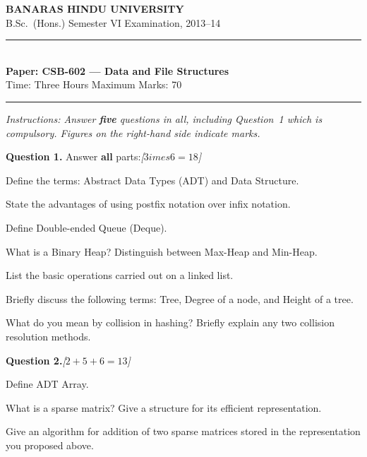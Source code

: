 \documentclass[11pt,a4paper]{article}
\newcommand{\pts}[1]{\hfill   \textit{[#1]}}
\begin{document}
\begin{center}
  {\large\bfseries BANARAS HINDU UNIVERSITY}\\[2pt]
  {\normalsize B.Sc.\ (Hons.) Semester VI Examination, 2013--14}\\[6pt]
  \rule{0.8\linewidth}{0.5pt}\\[6pt]
  {\large\bfseries Paper: CSB-602 --- Data and File Structures}\\[4pt]
  {\normalsize Time: Three Hours \hfill Maximum Marks: 70}
\end{center}

\rule{\linewidth}{0.4pt}

\smallskip



\noindent   \textit{Instructions: Answer   \textbf{five} questions in all, including Question~1 which is compulsory. Figures on the right-hand side indicate marks.}

\bigskip




\noindent   \textbf{Question 1.} Answer   \textbf{all} parts:\pts{$3 imes6=18$}

\begin{parts}
  \item Define the terms: Abstract Data Types (ADT) and Data Structure.
  \item State the advantages of using postfix notation over infix notation.
  \item Define Double-ended Queue (Deque).
  \item What is a Binary Heap? Distinguish between Max-Heap and Min-Heap.
  \item List the basic operations carried out on a linked list.
  \item Briefly discuss the following terms: Tree, Degree of a node, and Height of a tree.
  \item What do you mean by collision in hashing? Briefly explain any two collision resolution methods.
\end{parts}

\bigskip




\noindent   \textbf{Question 2.}\pts{$2+5+6=13$}

\begin{parts}
  \item Define ADT Array.
  \item What is a sparse matrix? Give a structure for its efficient representation.
  \item Give an algorithm for addition of two sparse matrices stored in the representation you proposed above.
\end{parts}
\end{document}
